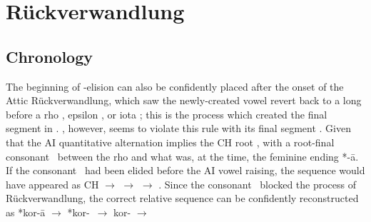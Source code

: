 \section{R\"uckverwandlung}\label{sec:Ruck}

\subsection{}\label{subsec:Plaus2}

\subsection{Chronology}\label{subsec:Chronology}
The beginning of \w-elision can also be confidently placed after
the onset of the Attic R\"uckverwandlung, which saw the newly-created
vowel \ipa{\ae:} revert back to a long  before a rho ,
epsilon , or iota ; this is the process which
created the final segment  in . , however, seems to
violate this rule with its final segment . Given that the AI
quantitative alternation implies the CH root , with a root-final
consonant \w\ between the rho  and what was, at the time,
the feminine ending *-\={a}. If the consonant \w\ had been elided before the AI
vowel raising, the sequence would have appeared as CH  $\to$
 $\to$  $\to$ . Since the consonant \w\ blocked the
process of R\"uckverwandlung, the correct relative sequence can be
confidently reconstructed as *kor\w-\=a $\to$ *kor\w-\ash\ $\to$ kor\w-
$\to$  

